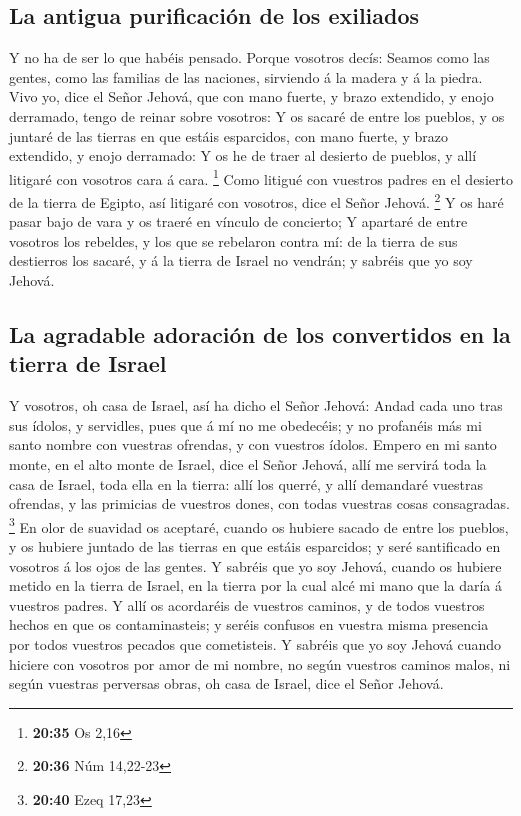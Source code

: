 \hypertarget{la-antigua-purificaciuxf3n-de-los-exiliados}{%
\subsection{La antigua purificación de los
exiliados}\label{la-antigua-purificaciuxf3n-de-los-exiliados}}

 Y no ha de ser lo que habéis pensado. Porque vosotros
decís: Seamos como las gentes, como las familias de las naciones,
sirviendo á la madera y á la piedra.  Vivo yo, dice el
Señor Jehová, que con mano fuerte, y brazo extendido, y enojo derramado,
tengo de reinar sobre vosotros:  Y os sacaré de entre los
pueblos, y os juntaré de las tierras en que estáis esparcidos, con mano
fuerte, y brazo extendido, y enojo derramado:  Y os he de
traer al desierto de pueblos, y allí litigaré con vosotros cara á cara.
\footnote{\textbf{20:35} Os 2,16}  Como litigué con
vuestros padres en el desierto de la tierra de Egipto, así litigaré con
vosotros, dice el Señor Jehová. \footnote{\textbf{20:36} Núm 14,22-23}
 Y os haré pasar bajo de vara y os traeré en vínculo de
concierto;  Y apartaré de entre vosotros los rebeldes, y
los que se rebelaron contra mí: de la tierra de sus destierros los
sacaré, y á la tierra de Israel no vendrán; y sabréis que yo soy Jehová.

\hypertarget{la-agradable-adoraciuxf3n-de-los-convertidos-en-la-tierra-de-israel}{%
\subsection{La agradable adoración de los convertidos en la tierra de
Israel}\label{la-agradable-adoraciuxf3n-de-los-convertidos-en-la-tierra-de-israel}}

 Y vosotros, oh casa de Israel, así ha dicho el Señor
Jehová: Andad cada uno tras sus ídolos, y servidles, pues que á mí no me
obedecéis; y no profanéis más mi santo nombre con vuestras ofrendas, y
con vuestros ídolos.  Empero en mi santo monte, en el
alto monte de Israel, dice el Señor Jehová, allí me servirá toda la casa
de Israel, toda ella en la tierra: allí los querré, y allí demandaré
vuestras ofrendas, y las primicias de vuestros dones, con todas vuestras
cosas consagradas. \footnote{\textbf{20:40} Ezeq 17,23} 
En olor de suavidad os aceptaré, cuando os hubiere sacado de entre los
pueblos, y os hubiere juntado de las tierras en que estáis esparcidos; y
seré santificado en vosotros á los ojos de las gentes.  Y
sabréis que yo soy Jehová, cuando os hubiere metido en la tierra de
Israel, en la tierra por la cual alcé mi mano que la daría á vuestros
padres.  Y allí os acordaréis de vuestros caminos, y de
todos vuestros hechos en que os contaminasteis; y seréis confusos en
vuestra misma presencia por todos vuestros pecados que cometisteis.
 Y sabréis que yo soy Jehová cuando hiciere con vosotros
por amor de mi nombre, no según vuestros caminos malos, ni según
vuestras perversas obras, oh casa de Israel, dice el Señor Jehová.

